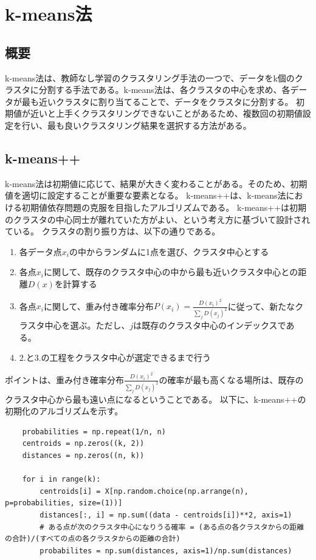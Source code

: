 \documentclass{ltjsarticle}
\begin{document}
\newpage

\section{k-means法}
\subsection{概要}
k-means法は、教師なし学習のクラスタリング手法の一つで、データをk個のクラスタに分割する手法である。k-means法は、各クラスタの中心を求め、各データが最も近いクラスタに割り当てることで、データをクラスタに分割する。
初期値が近いと上手くクラスタリングできないことがあるため、複数回の初期値設定を行い、最も良いクラスタリング結果を選択する方法がある。
\subsection{k-means++}
k-means法は初期値に応じて、結果が大きく変わることがある。そのため、初期値を適切に設定することが重要な要素となる。
k-means++は、k-means法における初期値依存問題の克服を目指したアルゴリズムである。
k-means++は初期のクラスタの中心同士が離れていた方がよい、という考え方に基づいて設計されている。
クラスタの割り振り方は、以下の通りである。
\begin{enumerate}
  \item 各データ点$x_i$の中からランダムに1点を選び、クラスタ中心とする
  \item 各点$x_i$に関して、既存のクラスタ中心の中から最も近いクラスタ中心との距離$D(x)$を計算する
  \item 各点$x_i$に関して、重み付き確率分布$P(x_i) = \frac{D(x_i)^2}{\sum_{j}D(x_j)^2}$に従って、新たなクラスタ中心を選ぶ。ただし、$j$は既存のクラスタ中心のインデックスである。
  \item 2.と3.の工程をクラスタ中心が選定できるまで行う
\end{enumerate}
ポイントは、重み付き確率分布$\frac{D(x_i)^2}{\sum_{j}D(x_j)^2}$の確率が最も高くなる場所は、既存のクラスタ中心から最も遠い点になるということである。
以下に、k-means++の初期化のアルゴリズムを示す。

\begin{itembox}[l]{}
  \begin{verbatim}
    probabilities = np.repeat(1/n, n)
    centroids = np.zeros((k, 2))
    distances = np.zeros((n, k))

    for i in range(k):
        centroids[i] = X[np.random.choice(np.arrange(n), p=probabilities, size=(1))]
        distances[:, i] = np.sum((data - centroids[i])**2, axis=1)
        # ある点が次のクラスタ中心になりうる確率 = (ある点の各クラスタからの距離の合計)/(すべての点の各クラスタからの距離の合計)
        probabilites = np.sum(distances, axis=1)/np.sum(distances) 
        
  \end{verbatim}
\end{itembox}
\end{document}
